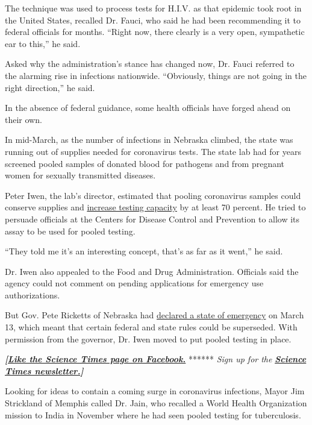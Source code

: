 The technique was used to process tests for H.I.V. as that epidemic took
root in the United States, recalled Dr. Fauci, who said he had been
recommending it to federal officials for months. ``Right now, there
clearly is a very open, sympathetic ear to this,'' he said.

Asked why the administration's stance has changed now, Dr. Fauci
referred to the alarming rise in infections nationwide. ``Obviously,
things are not going in the right direction,'' he said.

In the absence of federal guidance, some health officials have forged
ahead on their own.

In mid-March, as the number of infections in Nebraska climbed, the state
was running out of supplies needed for coronavirus tests. The state lab
had for years screened pooled samples of donated blood for pathogens and
from pregnant women for sexually transmitted diseases.

Peter Iwen, the lab's director, estimated that pooling coronavirus
samples could conserve supplies and
\href{https://academic.oup.com/ajcp/article/153/6/715/5822023}{increase
testing capacity} by at least 70 percent. He tried to persuade officials
at the Centers for Disease Control and Prevention to allow its assay to
be used for pooled testing.

``They told me it's an interesting concept, that's as far as it went,''
he said.

Dr. Iwen also appealed to the Food and Drug Administration. Officials
said the agency could not comment on pending applications for emergency
use authorizations.

But Gov. Pete Ricketts of Nebraska had
\href{https://governor.nebraska.gov/press/gov-ricketts-issues-emergency-declaration-covid-19}{declared
a state of emergency} on March 13, which meant that certain federal and
state rules could be superseded. With permission from the governor, Dr.
Iwen moved to put pooled testing in place.

\textbf{\emph{{[}}\href{http://on.fb.me/1paTQ1h}{\emph{Like the Science
Times page on Facebook.}}} ****** \emph{\textbar{} Sign up for the}
\textbf{\href{http://nyti.ms/1MbHaRU}{\emph{Science Times
newsletter.}}\emph{{]}}}

Looking for ideas to contain a coming surge in coronavirus infections,
Mayor Jim Strickland of Memphis called Dr. Jain, who recalled a World
Health Organization mission to India in November where he had seen
pooled testing for tuberculosis.

